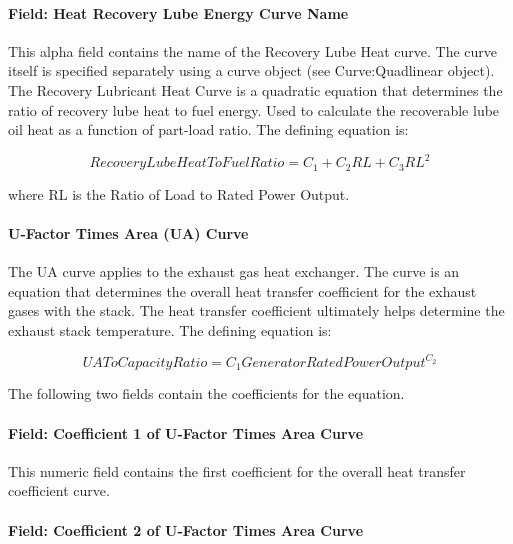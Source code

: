\paragraph{Field: Heat Recovery Lube Energy Curve Name}\label{field-heat-recovery-lube-energy-curve-name}

This alpha field contains the name of the Recovery Lube Heat curve. The curve itself is specified separately using a curve object (see Curve:Quadlinear object). The Recovery Lubricant Heat Curve is a quadratic equation that determines the ratio of recovery lube heat to fuel energy. Used to calculate the recoverable lube oil heat as a function of part-load ratio. The defining equation is:

\begin{equation}
RecoveryLubeHeatToFuelRatio = {C_1} + {C_2}RL + {C_3}R{L^2}
\end{equation}

where RL is the Ratio of Load to Rated Power Output.

\paragraph{U-Factor Times Area (UA) Curve}\label{u-factor-times-area-ua-curve-1}

The UA curve applies to the exhaust gas heat exchanger. The curve is an equation that determines the overall heat transfer coefficient for the exhaust gases with the stack. The heat transfer coefficient ultimately helps determine the exhaust stack temperature. The defining equation is:

\begin{equation}
UAToCapacityRatio = {C_1}GeneratorRatedPowerOutpu{t^{{C_2}}}
\end{equation}

The following two fields contain the coefficients for the equation.

\paragraph{Field: Coefficient 1 of U-Factor Times Area Curve}\label{field-coefficient-1-of-u-factor-times-area-curve-1}

This numeric field contains the first coefficient for the overall heat transfer coefficient curve.

\paragraph{Field: Coefficient 2 of U-Factor Times Area Curve}\label{field-coefficient-2-of-u-factor-times-area-curve-1}

